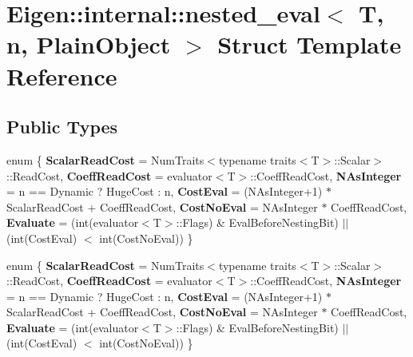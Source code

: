\hypertarget{struct_eigen_1_1internal_1_1nested__eval}{}\section{Eigen\+:\+:internal\+:\+:nested\+\_\+eval$<$ T, n, Plain\+Object $>$ Struct Template Reference}
\label{struct_eigen_1_1internal_1_1nested__eval}
\subsection*{Public Types}
\begin{DoxyCompactItemize}
\item 
\mbox{\label{struct_eigen_1_1internal_1_1nested__eval_a642d2a23dee218ede5fa9e62d0f2c2c7}} 
enum \{ \newline
{\bfseries Scalar\+Read\+Cost} = Num\+Traits$<$typename traits$<$T$>$\+:\+:Scalar$>$\+:\+:Read\+Cost, 
{\bfseries Coeff\+Read\+Cost} = evaluator$<$T$>$\+:\+:Coeff\+Read\+Cost, 
{\bfseries N\+As\+Integer} = n == Dynamic ? Huge\+Cost \+: n, 
{\bfseries Cost\+Eval} = (N\+As\+Integer+1) $\ast$ Scalar\+Read\+Cost + Coeff\+Read\+Cost, 
\newline
{\bfseries Cost\+No\+Eval} = N\+As\+Integer $\ast$ Coeff\+Read\+Cost, 
{\bfseries Evaluate} = (int(evaluator$<$T$>$\+:\+:Flags) \& Eval\+Before\+Nesting\+Bit) $\vert$$\vert$ (int(Cost\+Eval) $<$ int(Cost\+No\+Eval))
 \}
\item 
\mbox{\label{struct_eigen_1_1internal_1_1nested__eval_a71d71103f53b629b4c5508dce1ddc026}} 
enum \{ \newline
{\bfseries Scalar\+Read\+Cost} = Num\+Traits$<$typename traits$<$T$>$\+:\+:Scalar$>$\+:\+:Read\+Cost, 
{\bfseries Coeff\+Read\+Cost} = evaluator$<$T$>$\+:\+:Coeff\+Read\+Cost, 
{\bfseries N\+As\+Integer} = n == Dynamic ? Huge\+Cost \+: n, 
{\bfseries Cost\+Eval} = (N\+As\+Integer+1) $\ast$ Scalar\+Read\+Cost + Coeff\+Read\+Cost, 
\newline
{\bfseries Cost\+No\+Eval} = N\+As\+Integer $\ast$ Coeff\+Read\+Cost, 
{\bfseries Evaluate} = (int(evaluator$<$T$>$\+:\+:Flags) \& Eval\+Before\+Nesting\+Bit) $\vert$$\vert$ (int(Cost\+Eval) $<$ int(Cost\+No\+Eval))
 \}
\item 
\mbox{\label{struct_eigen_1_1internal_1_1nested__eval_a3e0ad119cd1fee5aba6b98cb7e7ad2fe}} 

\end{DoxyCompactItemize}
